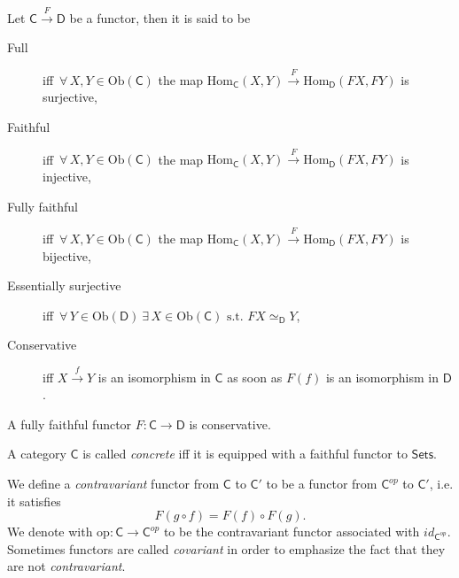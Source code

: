 \begin{defn}
	Let $\mathsf{C} \xrightarrow{F} \mathsf{D}$ be a functor, then it is said to be
	\begin{description}
		\item[Full] iff $\,\forall\, X,Y \in \mathrm{Ob} \left(\mathsf{C}\right)$ the map $\mathrm{Hom}_{\mathsf{C}} \left( X, Y \right) \xrightarrow{F} \mathrm{Hom}_{\mathsf{D}} \left( FX, FY \right)$ is surjective,
		\item[Faithful] iff $\,\forall\, X,Y \in \mathrm{Ob} \left(\mathsf{C}\right)$ the map $\mathrm{Hom}_{\mathsf{C}} \left( X, Y \right) \xrightarrow{F} \mathrm{Hom}_{\mathsf{D}} \left( FX, FY \right)$ is injective,
		\item[Fully faithful] iff $\,\forall\, X,Y \in \mathrm{Ob} \left(\mathsf{C}\right)$ the map $\mathrm{Hom}_{\mathsf{C}} \left( X, Y \right) \xrightarrow{F} \mathrm{Hom}_{\mathsf{D}} \left( FX, FY \right)$ is bijective,
		\item[Essentially surjective] iff $\,\forall\, Y \in \mathrm{Ob} \left(\mathsf{D}\right)\ \exists\, X \in \mathrm{Ob} \left(\mathsf{C}\right) \text{ s.t. } FX \simeq_{\mathsf{D}} Y$,
		\item[Conservative] iff $X \xrightarrow{f} Y$ is an isomorphism in $\mathsf{C}$ as soon as $F(f)$ is an isomorphism in $\mathsf{D}$.
	\end{description} 
\end{defn}

\begin{rem}
	A fully faithful functor $F\colon \mathsf{C} \to \mathsf{D}$ is conservative.
\end{rem}


\begin{defn}
	A category $\mathsf{C}$ is called {\em concrete} iff it is equipped with a faithful functor to $\mathsf{Sets}$.
\end{defn}


\begin{defn}
	We define a {\em contravariant} functor from $\mathsf{C}$ to $\mathsf{C}'$ to be a functor from $\mathsf{C}^{op}$ to $\mathsf{C}'$, i.e. it satisfies
	\begin{equation}
		F(g \circ f) = F(f) \circ F(g)
	.\end{equation}
	We denote with $\mathrm{op}\colon \mathsf{C} \to \mathsf{C}^{op}$ to be the contravariant functor associated with $id_{\mathsf{C}^{op}}$.
	Sometimes functors are called {\em covariant} in order to emphasize the fact that they are not {\em contravariant}.
\end{defn}

